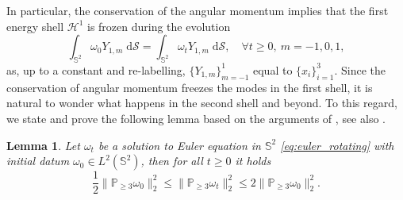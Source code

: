 \documentclass{amsart}
\newtheorem{lemma}{Lemma}[section]
\newtheorem{lemma}{Lemma}[section]  %
\def\esse{{\mathbb{S}}}
\begin{document}
In particular, the conservation of the angular momentum implies that the first energy shell $\mathcal{H}^1$ is frozen during the evolution
$$
\int_{\esse^2}\omega_0 Y_{1,m}\;\mathrm{d}\mathcal{S}=\int_{\esse^2}\omega_t Y_{1,m}\;\mathrm{d}\mathcal{S},\quad\forall t\geq0,\ m=-1,0,1,
$$
as, up to a constant and re-labelling, $\{Y_{1,m}\}_{m=-1}^1$ equal to $\{x_i\}_{i=1}^3$. Since the conservation of angular momentum freezes the modes in the first shell, it is natural to wonder what happens in the second shell and beyond. To this regard, we state and prove the following lemma based on the arguments of \cite[Section 3]{Wirosoetisno1999}, see also \cite[Theorem 7 (iii)]{constantin2025onsetinstabilityzonalstratospheric}.
\begin{lemma} \label{lemma:Z_prime}
    Let $\omega_t$ be a solution to Euler equation in $\esse^2$ \eqref{eq:euler_rotating} with initial datum $\omega_0\in L^2(\esse^2)$, then for all $t\geq0$ it holds
    \begin{equation}
        \frac{1}{2}\|\mathbb{P}_{\geq3}\omega_0\|_2^2\leq \|\mathbb{P}_{\geq3}\omega_t\|_2^2\leq2\|\mathbb{P}_{\geq3}\omega_0\|_2^2.
        \label{eq:Zprime_eq_ofthelemma}
    \end{equation}
\end{lemma}
\end{document}
